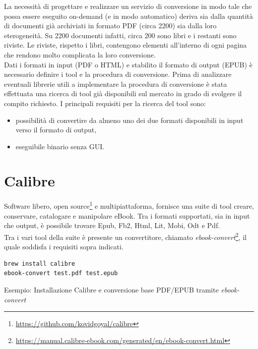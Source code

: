 
La necessità di progettare e realizzare un servizio di conversione in modo tale che possa essere eseguito on-demand (e in modo automatico) deriva sia dalla quantità di documenti già archiviati in formato PDF (circa 2200) sia dalla loro eterogeneità. Su 2200 documenti infatti, circa 200 sono libri e i restanti sono riviste. Le riviste, rispetto i libri, contengono elementi all'interno di ogni pagina che rendono molto complicata la loro conversione.\\
Dati i formati in input (PDF o HTML) e stabilito il formato di output (EPUB) è necessario definire i tool e la procedura di conversione. Prima di analizzare eventuali librerie utili a implementare la procedura di conversione è stata effettuata una ricerca di tool già disponibili sul mercato in grado di svolgere il compito richiesto. I principali requisiti per la ricerca del tool sono:
\begin{itemize}
    \item possibilità di convertire da almeno uno dei due formati disponibili in input verso il formato di output,
    \item eseguibile binario senza GUI.
\end{itemize}

\section{Calibre}
Software libero, open source\footnote{\url{https://github.com/kovidgoyal/calibre}} e multipiattaforma, fornisce una suite di tool creare, conservare, catalogare e manipolare eBook. Tra i formati supportati, sia in input che output, è possibile trovare Epub, Fb2, Html, Lit, Mobi, Odt e Pdf.\\
Tra i vari tool della suite è presente un convertitore, chiamato \textit{ebook-convert}\footnote{\url{https://manual.calibre-ebook.com/generated/en/ebook-convert.html}}, il quale soddisfa i requisiti sopra indicati.

\begin{listing}[H]
\begin{verbatim}
brew install calibre
ebook-convert test.pdf test.epub
\end{verbatim}
\caption{Esempio: Installazione Calibre e conversione base PDF/EPUB tramite \textit{ebook-convert}}
\end{listing}


